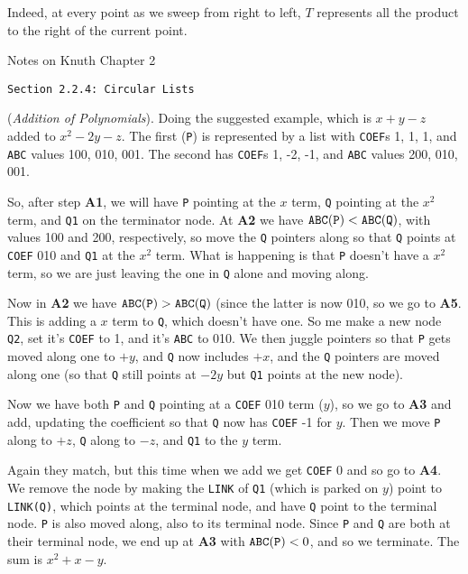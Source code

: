 Indeed, at every point as we sweep from right to left, $T$ represents all the
product to the right of the current point.

\vfil\break
\topglue 0.5in
\centerline{Notes on Knuth Chapter 2}
\vskip 0.3in

\centerline{\tt Section 2.2.4: Circular Lists}
\vskip 0.2in

 ({\it Addition of Polynomials}).\hfil\break  
Doing the suggested example,
which is $x + y - z$ added to $x^2 - 2 y - z$.  The first ({\tt P}) is represented
by a list with {\tt COEF}s 1, 1, 1, and {\tt ABC} values 100, 010, 001.  The second
has {\tt COEF}s 1, -2, -1, and {\tt ABC} values 200, 010, 001.

So, after step {\bf A1}, we will have {\tt P} pointing at the $x$ term, {\tt Q} pointing
at the $x^2$ term, and {\tt Q1} on the terminator node.  At {\bf A2} we have
${\tt ABC(P)} < {\tt ABC(Q)}$, with values 100 and 200, respectively, so move the
{\tt Q} pointers along so that {\tt Q} points at {\tt COEF} 010 and {\tt Q1} at the
$x^2$ term.  What is happening is that {\tt P} doesn't have a $x^2$ term, so
we are just leaving the one in {\tt Q} alone and moving along.

  Now in {\bf A2} we have ${\tt ABC(P)} > {\tt ABC(Q)}$ (since
the latter is now 010, so we go to {\bf A5}.  This is adding a $x$ term to {\tt Q},
which doesn't have one.  So me make a new node {\tt Q2}, set it's {\tt COEF}
to 1, and it's {\tt ABC} to 010.  We then juggle pointers so that {\tt P} gets
moved along one to $+y$, and {\tt Q} now includes $+x$, and the {\tt Q}
pointers are moved along one (so that {\tt Q} still points at $-2y$ but {\tt Q1}
points at the new node).

Now we have both {\tt P} and {\tt Q} pointing at a {\tt COEF} 010 term ($y$),
so we go to {\bf A3} and add, updating the coefficient so that {\tt Q} now
has {\tt COEF} -1 for $y$.  Then we move {\tt P} along to $+z$, {\tt Q}
along to $-z$, and {\tt Q1} to the $y$ term.

Again they match, but this time when we add we get {\tt COEF} 0 and so go to
{\bf A4}.  We remove the node by making the {\tt LINK} of {\tt Q1} (which is
parked on $y$) point to {\tt LINK(Q)}, which points at the terminal node,
and have {\tt Q} point to the terminal node.  {\tt P} is also moved along, also
to its terminal node.  Since {\tt P} and {\tt Q} are both at their terminal node,
we end up at {\bf A3} with ${\tt ABC(P)} < 0$, and so we terminate.  
The sum is $x^2 + x - y$.


